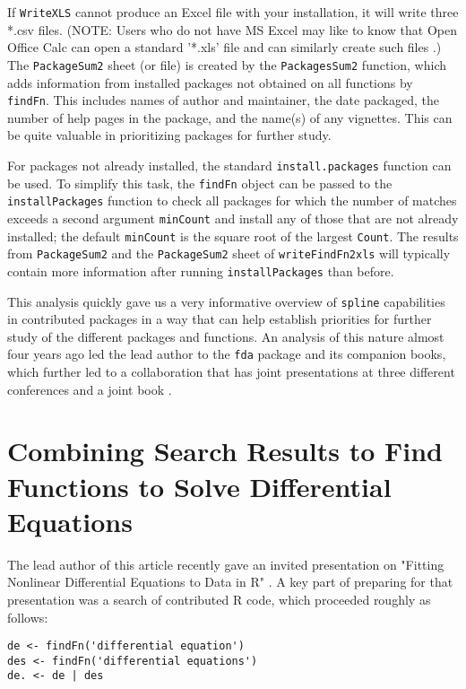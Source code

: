 If {\tt WriteXLS} cannot produce an Excel file with your
installation, it will write three *.csv files.  (NOTE:
Users who do not have MS Excel may like to know that
Open Office Calc can open a standard '*.xls' file and
can similarly create such files \citep{CALC09MAN}.)
The {\tt PackageSum2} sheet (or file) is created by the
{\tt PackagesSum2} function, which adds information from
installed packages not obtained on all functions by
{\tt findFn}.  This includes names of author and maintainer,
the date packaged, the number of help pages in the package,
and the name(s) of any vignettes.  This can be quite
valuable in prioritizing packages for further study.

For packages not already installed, the standard
{\tt install.packages} function can be used.  To simplify this
task, the {\tt findFn} object can be passed to the
{\tt installPackages} function to check all packages for which
the number of matches exceeds a second argument {\tt minCount}
and install any of those that are not already installed;  the
default {\tt minCount} is the square root of the largest
{\tt Count}.  The results from {\tt PackageSum2} and the
{\tt PackageSum2} sheet of {\tt writeFindFn2xls} will typically
contain more information after running {\tt installPackages}
than before.

This analysis quickly gave us a very informative overview of
{\tt spline} capabilities in contributed \R{} packages in a way
that can help establish priorities for further study of the
different packages and functions.  An analysis of this nature 
almost four years ago led the lead author to the {\tt fda} 
package and its companion books, which further led to a 
collaboration that has joint presentations at three different
conferences and a joint book \citep{RHG09}.


\section*{Combining Search Results to Find Functions to Solve Differential Equations}

The lead author of this article recently gave an invited presentation
on "Fitting Nonlinear Differential Equations to Data in R" \citep{GHR09}.
A key part of preparing for that presentation was a search 
of contributed R code, which proceeded roughly as follows:  

\begin{verbatim}
de <- findFn('differential equation') 
des <- findFn('differential equations')
de. <- de | des 
\end{verbatim}

